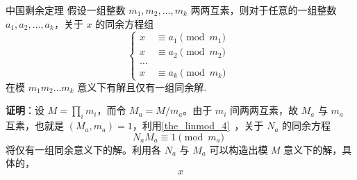 
\begin{theorem}{中国剩余定理}
假设一组整数 $m_1, m_2, \dots, m_k$ 两两互素，则对于任意的一组整数 $a_1, a_2, \dots, a_k$，关于 $x$ 的同余方程组
\begin{equation}\left\{
\begin{aligned}
x &\equiv a_1 \pmod{m_1} \\
x &\equiv a_2 \pmod{m_2} \\
\dots   \\
x &\equiv a_k \pmod{m_k}
\end{aligned}\right. ~~
\end{equation}
在模 $m_1m_2\dots m_k$ 意义下有解且仅有一组同余解.
\end{theorem}
\textbf{证明}：设 $M = \prod_i m_i$，而令 $M_a = M / m_a$。由于 $m_i$ 间两两互素，故 $M_a$ 与 $m_a$ 互素，也就是 $(M_a, m_a) = 1$，利用\autoref{the_linmod_4}~，关于 $N_a$ 的同余方程
\begin{equation}
N_a M_a \equiv 1 \pmod{m_a} ~~
\end{equation}
将仅有一组同余意义下的解。利用各 $N_a$ 与 $M_a$ 可以构造出模 $M$ 意义下的解，具体的，
\begin{equation}
x
\end{equation}
